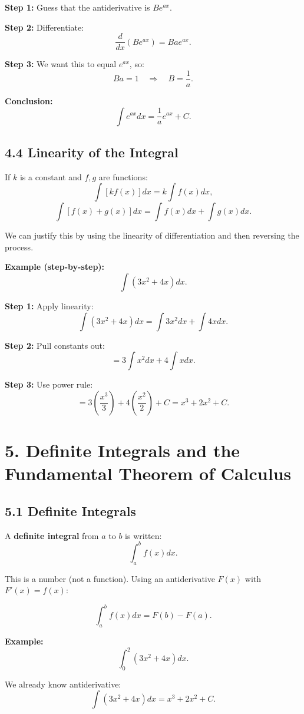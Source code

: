 \documentclass[12pt]{article}
\begin{document}
\textbf{Step 1:} Guess that the antiderivative is $B e^{ax}$.

\textbf{Step 2:} Differentiate:
\[
\frac{d}{dx} (B e^{ax}) = B a e^{ax}.
\]

\textbf{Step 3:} We want this to equal $e^{ax}$, so:
\[
Ba = 1 \quad \Rightarrow \quad B = \frac{1}{a}.
\]

\textbf{Conclusion:}
\[
\int e^{ax} dx = \frac{1}{a} e^{ax} + C.
\]

\subsection*{4.4 Linearity of the Integral}

If $k$ is a constant and $f,g$ are functions:
\[
\int [kf(x)]dx = k\int f(x)dx,
\]
\[
\int [f(x) + g(x)]dx = \int f(x)dx + \int g(x)dx.
\]

We can justify this by using the linearity of differentiation and then reversing the process.

\textbf{Example (step-by-step):}
\[
\int (3x^2 + 4x)dx.
\]

\textbf{Step 1:} Apply linearity:
\[
\int (3x^2 + 4x)dx = \int 3x^2 dx + \int 4x dx.
\]

\textbf{Step 2:} Pull constants out:
\[
=3 \int x^2 dx + 4\int x dx.
\]

\textbf{Step 3:} Use power rule:
\[
=3 \left(\frac{x^3}{3}\right) + 4\left(\frac{x^2}{2}\right) + C
= x^3 + 2x^2 + C.
\]
\newpage
\section*{5. Definite Integrals and the Fundamental Theorem of Calculus}

\subsection*{5.1 Definite Integrals}

A \textbf{definite integral} from $a$ to $b$ is written:
\[
\int_a^b f(x)dx.
\]

This is a number (not a function). Using an antiderivative $F(x)$ with $F'(x)=f(x)$:

\[
\int_a^b f(x)dx = F(b) - F(a).
\]

\textbf{Example:}
\[
\int_0^2 (3x^2 + 4x)dx.
\]

We already know antiderivative:
\[
\int (3x^2 + 4x)dx = x^3 + 2x^2 + C.
\]
\end{document}
